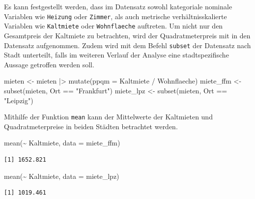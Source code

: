 \documentclass[
  a4paper,
  DIV=11]{scrartcl}
\newenvironment{Shaded}{\begin{snugshade}}{\end{snugshade}}
\newcommand{\AttributeTok}[1]{\textcolor[rgb]{0.40,0.45,0.13}{#1}}
\newcommand{\FunctionTok}[1]{\textcolor[rgb]{0.28,0.35,0.67}{#1}}
\newcommand{\NormalTok}[1]{\textcolor[rgb]{0.00,0.23,0.31}{#1}}
\newcommand{\OtherTok}[1]{\textcolor[rgb]{0.00,0.23,0.31}{#1}}
\newcommand{\SpecialCharTok}[1]{\textcolor[rgb]{0.37,0.37,0.37}{#1}}
\newcommand{\StringTok}[1]{\textcolor[rgb]{0.13,0.47,0.30}{#1}}
\begin{document}
Es kann festgestellt werden, dass im Datensatz sowohl kategoriale
nominale Variablen wie \texttt{Heizung} oder \texttt{Zimmer}, als auch
metrische verhältnisskalierte Variablen wie \texttt{Kaltmiete} oder
\texttt{Wohnflaeche} auftreten. Um nicht nur den Gesamtpreis der
Kaltmiete zu betrachten, wird der Quadratmeterpreis mit in den Datensatz
aufgenommen. Zudem wird mit dem Befehl \texttt{subset} der Datensatz
nach Stadt unterteilt, falls im weiteren Verlauf der Analyse eine
stadtspezifische Aussage getroffen werden soll.

\begin{Shaded}
\begin{Highlighting}[]
\NormalTok{mieten }\OtherTok{\textless{}{-}}\NormalTok{ mieten }\SpecialCharTok{|\textgreater{}}
  \FunctionTok{mutate}\NormalTok{(}\AttributeTok{ppqm =}\NormalTok{ Kaltmiete }\SpecialCharTok{/}\NormalTok{ Wohnflaeche)}
\NormalTok{miete\_ffm }\OtherTok{\textless{}{-}} \FunctionTok{subset}\NormalTok{(mieten, Ort }\SpecialCharTok{==} \StringTok{"Frankfurt"}\NormalTok{)}
\NormalTok{miete\_lpz }\OtherTok{\textless{}{-}} \FunctionTok{subset}\NormalTok{(mieten, Ort }\SpecialCharTok{==} \StringTok{"Leipzig"}\NormalTok{)}
\end{Highlighting}
\end{Shaded}

Mithilfe der Funktion \texttt{mean} kann der Mittelwerte der Kaltmieten
und Quadratmeterpreise in beiden Städten betrachtet werden.

\begin{Shaded}
\begin{Highlighting}[]
\FunctionTok{mean}\NormalTok{(}\SpecialCharTok{\textasciitilde{}}\NormalTok{ Kaltmiete, }\AttributeTok{data =}\NormalTok{ miete\_ffm)}
\end{Highlighting}
\end{Shaded}

\begin{verbatim}
[1] 1652.821
\end{verbatim}

\begin{Shaded}
\begin{Highlighting}[]
\FunctionTok{mean}\NormalTok{(}\SpecialCharTok{\textasciitilde{}}\NormalTok{ Kaltmiete, }\AttributeTok{data =}\NormalTok{ miete\_lpz)}
\end{Highlighting}
\end{Shaded}

\begin{verbatim}
[1] 1019.461
\end{verbatim}
\end{document}
